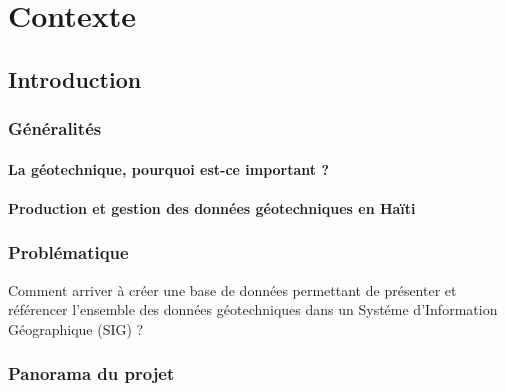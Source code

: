 \chapter{Contexte}
    \section{Introduction}
        
        \subsection{Généralités}
            \subsubsection{La géotechnique, pourquoi est-ce important ?}
            
            \subsubsection{Production et gestion des données géotechniques en Haïti}
                
        \subsection{Problématique}
        Comment arriver à créer une base de données permettant de 
        présenter et référencer l'ensemble des données géotechniques dans un Systéme
        d’Information Géographique (SIG) ?
       
        \subsection{Panorama du projet}
            
    \newpage